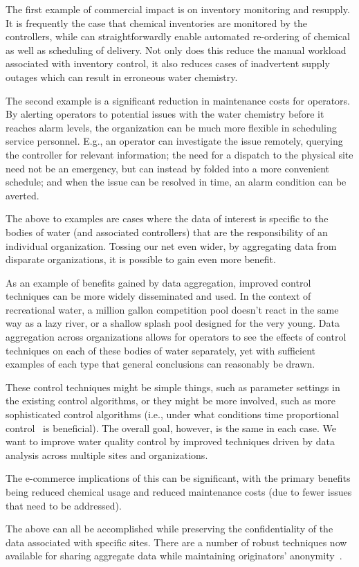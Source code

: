 The first example of commercial impact is on inventory monitoring
and resupply. It is frequently the case that chemical inventories
are monitored by the controllers, while can straightforwardly enable
automated re-ordering of chemical as well as scheduling of delivery.
Not only does this reduce the manual workload associated with
inventory control, it also reduces cases of inadvertent supply outages
which can result in erroneous water chemistry.

The second example is a significant reduction in maintenance costs
for operators.  By alerting operators to potential
issues with the water chemistry before it reaches alarm levels, 
the organization can be much more flexible in scheduling service
personnel. E.g., an operator can investigate the issue remotely,
querying the controller for relevant information; the need for
a dispatch to the physical site need not be an emergency, but can
instead by folded into a more convenient schedule; and when the
issue can be resolved in time, an alarm condition can be averted.

The above to examples are cases where the data of interest is specific
to the bodies of water (and associated controllers) that are the
responsibility of an individual organization.  Tossing our net
even wider, by aggregating data from disparate organizations, it
is possible to gain even more benefit.

As an example of benefits gained by data aggregation, improved
control techniques can be more widely disseminated and used.
In the context of recreational water, a million gallon competition
pool doesn't react in the same way as a lazy river, or a shallow
splash pool designed for the very young. Data aggregation across
organizations allows for operators to see the effects of control
techniques on each of these bodies of water separately, yet with
sufficient examples of each type that general conclusions can
reasonably be drawn.

These control techniques might be simple things, such as parameter
settings in the existing control algorithms, or they might be
more involved, such as more sophisticated control algorithms
(i.e., under what conditions time proportional control~\cite{McP13}
is beneficial). The overall goal, however, is the same in each
case. We want to improve water quality control by improved techniques
driven by data analysis across multiple sites and organizations.

The e-commerce implications of this can be significant, with the
primary benefits being reduced chemical usage and reduced maintenance
costs (due to fewer issues that need to be addressed).

The above can all be accomplished while preserving the confidentiality
of the data associated with specific sites.  There are a number
of robust techniques now available for sharing aggregate data
while maintaining originators' anonymity~\cite{horey2007,zhong2009k}.
